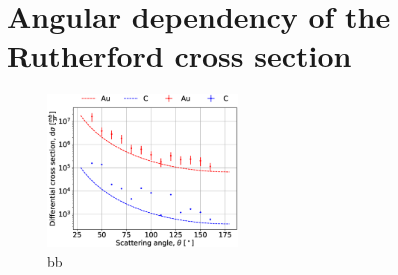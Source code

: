 \section{Angular dependency of the Rutherford cross section}

\begin{figure}[h]
	\centering
		\includegraphics[width=0.45\textwidth]{graphics/differential_cross_section.eps}
	\caption{bb}
	\label{fig:Differential_cross_section}
\end{figure}
\newpage
